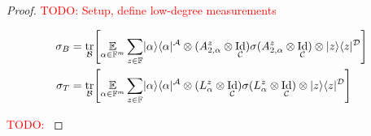 \documentclass[english,12pt]{reedthesis}
\theoremstyle{plain}
\theoremstyle{definition}
\theoremstyle{remark}
\DeclareMathOperator{\Id}{Id}
\DeclareMathOperator{\tr}{tr}
\DeclarePairedDelimiter\bra{\langle}{\rvert}
\DeclarePairedDelimiter\ket{\lvert}{\rangle}
\newcommand{\TODO}[1]{\textcolor{red}{TODO: #1}}
\begin{document}
\begin{proof}
  \TODO{Setup, define low-degree measurements}

  \begin{align}
    \sigma_{B} &= \tr_{\mathcal{B}}\mleft[
              \underset{\alpha \in \mathbb{F}^{m}}{\mathbb{E}}\sum_{z \in \mathbb{F}}
              \ket{\alpha}\bra{\alpha}^{\mathcal{A}} \otimes (A_{2,\alpha}^{z} \otimes \Id_{\mathcal{C}})\sigma(A_{2,\alpha}^{z} \otimes \Id_{\mathcal{C}}) \otimes \ket{z}\bra{z}^{\mathcal{D}}
            \mright]\label{eqn:sigma-b} \\
    \sigma_{T} &= \tr_{\mathcal{B}}\mleft[
              \underset{\alpha \in \mathbb{F}^{m}}{\mathbb{E}}\sum_{z \in \mathbb{F}}
              \ket{\alpha}\bra{\alpha}^{\mathcal{A}} \otimes (L_{\alpha}^{z} \otimes \Id_{\mathcal{C}})\sigma(L_{\alpha}^{z} \otimes \Id_{\mathcal{C}}) \otimes \ket{z}\bra{z}^{\mathcal{D}}
            \mright]\label{eqn:sigma-t}
  \end{align}

  \TODO{}


\end{proof}
\end{document}
